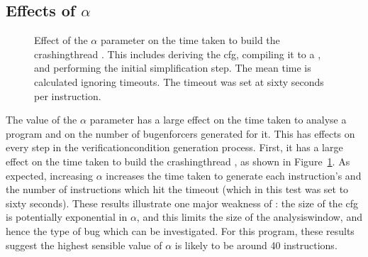 
\subsection{Effects of $\alpha$}



\begin{figure}
  
  \caption{Effect of the $\alpha$ parameter on the time taken to build
    the \gls{crashingthread} {\StateMachines}.  This includes deriving
    the \gls{cfg}, compiling it to a {\StateMachine}, and performing
    the initial simplification step.  The mean time is calculated
    ignoring timeouts.  The timeout was set at sixty seconds per
    instruction.}
  \label{fig:perf:alpha:bpm:unopt}
\end{figure}

The value of the $\alpha$ parameter has a large effect on the time
taken to analyse a program and on the number of \glspl{bugenforcer}
generated for it.  This has effects on every step in the
\gls{verificationcondition} generation process.  First, it has a large
effect on the time taken to build the \gls{crashingthread}
{\StateMachines}, as shown in Figure~\ref{fig:perf:alpha:bpm:unopt}.  As
expected, increasing $\alpha$ increases the time taken to generate
each instruction's {\StateMachine} and the number of instructions
which hit the timeout (which in this test was set to sixty seconds).
These results illustrate one major weakness of {\technique}: the size
of the \gls{cfg} is potentially exponential in $\alpha$, and this
limits the size of the \gls{analysiswindow}, and hence the type of bug
which can be investigated.  For this program, these results suggest
the highest sensible value of $\alpha$ is likely to be around 40
instructions.

